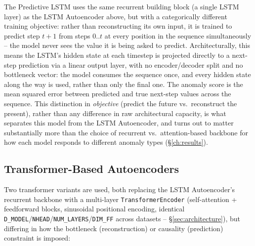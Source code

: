 The Predictive LSTM uses the same recurrent building block (a single LSTM layer) as the LSTM Autoencoder above, but with a categorically different training objective: rather than reconstructing its own input, it is trained to predict step $t+1$ from steps $0..t$ at every position in the sequence simultaneously -- the model never sees the value it is being asked to predict. Architecturally, this means the LSTM's hidden state at each timestep is projected directly to a next-step prediction via a linear output layer, with no encoder/decoder split and no bottleneck vector: the model consumes the sequence once, and every hidden state along the way is used, rather than only the final one. The anomaly score is the mean squared error between predicted and true next-step values across the sequence. This distinction in \emph{objective} (predict the future vs.\ reconstruct the present), rather than any difference in raw architectural capacity, is what separates this model from the LSTM Autoencoder, and turns out to matter substantially more than the choice of recurrent vs.\ attention-based backbone for how each model responds to different anomaly types (\S\ref{ch:results}).

\subsection{Transformer-Based Autoencoders}

Two transformer variants are used, both replacing the LSTM Autoencoder's recurrent backbone with a multi-layer \texttt{TransformerEncoder} (self-attention + feedforward blocks, sinusoidal positional encoding, identical \texttt{D\_MODEL}/\texttt{NHEAD}/\texttt{NUM\_LAYERS}/\texttt{DIM\_FF} across datasets -- \S\ref{sec:architecture}), but differing in how the bottleneck (reconstruction) or causality (prediction) constraint is imposed:

